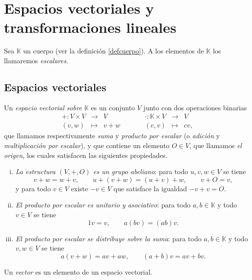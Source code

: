 \chapter{Espacios vectoriales y transformaciones lineales}

Sea $\mathbb{K}$ un cuerpo (ver la definición \ref{defcuerpo}). A los elementos de $\mathbb{K}$ los llamaremos \emph{escalares}.

\section{Espacios vectoriales}

\begin{defn}\label{defespvec}
Un \emph{espacio vectorial sobre $\mathbb{K}$} es un conjunto $V$ junto con dos operaciones binarias
\[
\begin{array}{rclcrcl}
+:V\times V & \longrightarrow & V &\qquad& \cdot: \mathbb{K}\times V & \longrightarrow & V \\
(v,w) & \longmapsto & v+w &\qquad& (c,v) & \longmapsto & cv, 
\end{array}
\]
que llamamos respectivamente \emph{suma} y \emph{producto por escalar} (o \emph{adici\'on} y \emph{multiplicaci\'on por escalar}), y que contiene un elemento $O\in V$, que llamamos \emph{el origen}, los cuales satisfacen las siguientes propiedades.
\begin{enumerate}[(i)]
\item \emph{La estructura $(V,+,O)$ es un grupo abeliano}: para todo $u,v,w\in V$ se tiene
\[ v+w=w+v,\qquad u+(v+w)=(u+v)+w,\qquad v+O=v,\]
y para todo $v\in V$ existe $-v\in V$ que satisface la igualdad $-v+v=O$.
\item \emph{El producto por escalar es unitario y asociativo}: para todo $a,b\in \mathbb{K}$ y todo $v\in V$ se tiene
\[ 1v=v,\qquad a(bv)=(ab)v.\]
\item \emph{El producto por escalar se distribuye sobre la suma}: para todo $a,b\in \mathbb{K}$ y todo $v,w\in V$ se tiene
\[ a(v+w)=av+aw,\qquad (a+b)v=av+bv.\] 
\end{enumerate}
Un \emph{vector} es un elemento de un espacio vectorial.
\end{defn}

